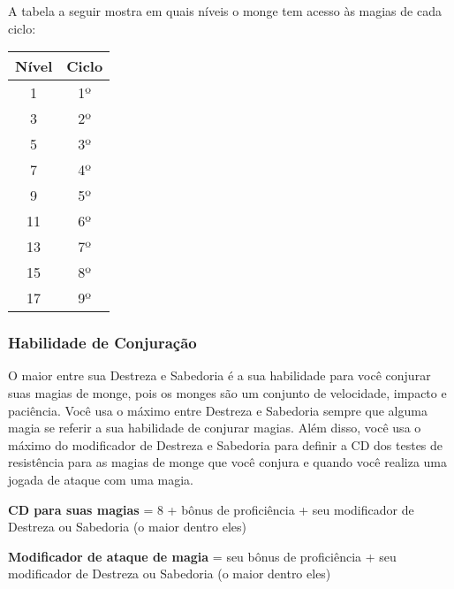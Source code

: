 \begin{multicols}{2}
A tabela a seguir mostra em quais níveis o monge tem acesso às magias de cada
ciclo:

\begin{center}
\begin{tabular}{|||c||c|||}
    \hline
    \textbf{Nível} & \textbf{Ciclo} \\
    \hline
    1 & 1º \\
    \hline
    3 & 2º \\
    \hline
    5 & 3º \\
    \hline
    7 & 4º \\
    \hline
    9 & 5º \\
    \hline
    11 & 6º \\
    \hline
    13 & 7º \\
    \hline
    15 & 8º \\
    \hline
    17 & 9º \\
    \hline
\end{tabular}
\end{center}

\subsubsection*{Habilidade de Conjuração}%

O maior entre sua Destreza e Sabedoria é a sua habilidade para você conjurar
suas magias de monge, pois os monges são um conjunto de velocidade, impacto e
paciência. Você usa o máximo entre Destreza e Sabedoria sempre que alguma magia
se referir a sua habilidade de conjurar magias. Além disso, você usa o máximo do
modificador de Destreza e Sabedoria para definir a CD dos testes de resistência
para as magias de monge que você conjura e quando você realiza uma jogada de
ataque com uma magia.

\begin{center}
\textbf{CD para suas magias} = 8 + bônus de proficiência + seu modificador de
Destreza ou Sabedoria (o maior dentro eles) \nl

\textbf{Modificador de ataque de magia} = seu bônus de proficiência + seu
modificador de Destreza ou Sabedoria (o maior dentro eles)
\end{center}
\end{multicols}

